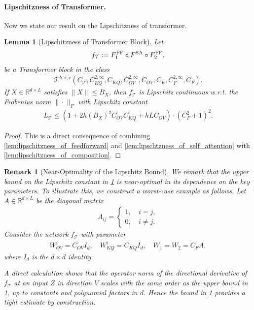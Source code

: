 \documentclass[12pt]{article}
\numberwithin{equation}{section}
\def\R{\mathbb{R}}
\theoremstyle{theoremstyle}
\newtheorem{lemma}{Lemma}[section]
\newtheorem{remark}{Remark}[section]
\numberwithin{equation}{section}
\numberwithin{theorem}{section}
\numberwithin{proposition}{section}
\numberwithin{definition}{section}
\numberwithin{lemma}{section}
\numberwithin{assumption}{section}
\numberwithin{remark}{section}
\begin{document}
\paragraph{Lipschitzness of Transformer.} Now we state our result on the Lipschitzness of transformer.

\begin{lemma}[Lipschitzness of Transformer Block]\label{lem:lipschitzness_of_approximator_transformer}
Let 
\begin{align*}
    f_\mathcal{T}:=F^{\rm FF}_1\circ F^{\rm SA}\circ F^{\rm FF}_2,
\end{align*}
be a Transformer block in the class 
\begin{align*}
    \mathcal{T}^{h,s,r}(C_\mathcal{T},C^{2,\infty}_{KQ},C_{KQ},C^{2,\infty}_{OV},C_{OV},C_{E},C^{2,\infty}_{F},C_{F}).
\end{align*}
If $X\in\R^{d\times L}$ satisfies $\|X\|\le B_X$, then $f_{\mathcal{T}}$ is Lipschitz continuous w.r.t. the Frobenius norm $\|\cdot\|_F$ with Lipschitz constant
\begin{align*}
    L_\mathcal{T}\leq (1+2h(B_X)^2C_{OV}C_{KQ}+hLC_{OV})\cdot(C_F^2+1)^2.
\end{align*}
\end{lemma}

\begin{proof}
This is a direct consequence of combining \cref{lem:lipschitzness_of_feedforward} and \cref{lem:lipschtzness_of_self_attention} with \cref{lem:lipschitzness_of_composition}.
\end{proof}

\begin{remark}[Near-Optimality of the Lipschitz Bound]\label{rem:optimality_of_transformer_lipschitzness}
We remark that the upper bound on the Lipschitz constant in \cref{lem:lipschitzness_of_approximator_transformer} is near-optimal in its dependence on the key parameters.  
To illustrate this, we construct a worst-case example as follows.  
Let $A \in \R^{d\times L}$ be the diagonal matrix 
\begin{align*}
    A_{ij}=
\begin{cases}
    1,~ & i=j, \\
    0,~ & i\neq j.
\end{cases}
\end{align*}
Consider the network $f_\mathcal{T}$ with parameter 
\begin{align*}
    W^i_{OV}=C_{OV}I_d,\quad
    W^i_{KQ}=C_{KQ}I_d,\quad
    W_1=W_2=C_FA,
\end{align*}
where $I_d$ is the $d\times d$ identity.  

A direct calculation shows that the operator norm of the directional derivative of $f_{\mathcal{T}}$ at an input $Z$ in direction $V$ scales with the same order as the upper bound in \cref{lem:lipschitzness_of_approximator_transformer}, up to constants and polynomial factors in $d$.  
Hence the bound in \cref{lem:lipschitzness_of_approximator_transformer} provides a tight estimate by construction.
\end{remark}
\end{document}
